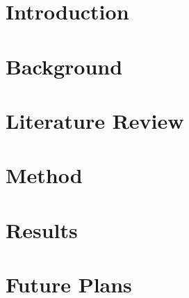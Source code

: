 \documentclass[12pt,letterpaper]{lsuetd}
\begin{document}
\chapter{Introduction}
\doublespacing

\pagebreak
\singlespacing
\chapter{Background}
\doublespacing

\pagebreak
\singlespacing
\label{Background}
\chapter{Literature Review}
\doublespacing

\pagebreak
\singlespacing
\chapter{Method}
\doublespacing

\pagebreak
\singlespacing
\label{Method}
\chapter{Results}
\doublespacing

\pagebreak
\singlespacing
\chapter{Future Plans}
\doublespacing

\pagebreak
\singlespacing
\vspace{0.9em}


%
\end{document}
